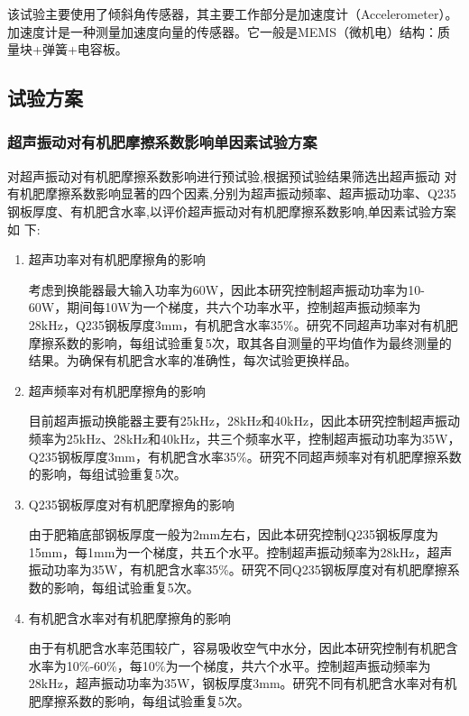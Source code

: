 该试验主要使用了倾斜角传感器，其主要工作部分是加速度计（Accelerometer）。加速度计是一种测量加速度向量的传感器。它一般是MEMS（微机电）结构：质量块+弹簧+电容板。



\subsection{试验方案}

\subsubsection{超声振动对有机肥摩擦系数影响单因素试验方案}

对超声振动对有机肥摩擦系数影响进行预试验,根据预试验结果筛选出超声振动  对有机肥摩擦系数影响显著的四个因素,分别为超声振动频率、超声振动功率、Q235  钢板厚度、有机肥含水率,以评价超声振动对有机肥摩擦系数影响,单因素试验方案如  下:

\begin{enumerate}
	\item 超声功率对有机肥摩擦角的影响

	考虑到换能器最大输入功率为60W，因此本研究控制超声振动功率为10-60W，期间每10W为一个梯度，共六个功率水平，控制超声振动频率为28kHz，Q235钢板厚度3mm，有机肥含水率35\%。研究不同超声功率对有机肥摩擦系数的影响，每组试验重复5次，取其各自测量的平均值作为最终测量的结果。为确保有机肥含水率的准确性，每次试验更换样品。

	\item 超声频率对有机肥摩擦角的影响
	
	目前超声振动换能器主要有25kHz，28kHz和40kHz，因此本研究控制超声振动频率为25kHz、28kHz和40kHz，共三个频率水平，控制超声振动功率为35W，Q235钢板厚度3mm，有机肥含水率35\%。研究不同超声频率对有机肥摩擦系数的影响，每组试验重复5次。

	\item Q235钢板厚度对有机肥摩擦角的影响
	
	由于肥箱底部钢板厚度一般为2mm左右，因此本研究控制Q235钢板厚度为15mm，每1mm为一个梯度，共五个水平。控制超声振动频率为28kHz，超声振动功率为35W，有机肥含水率35\%。研究不同Q235钢板厚度对有机肥摩擦系数的影响，每组试验重复5次。

	\item 有机肥含水率对有机肥摩擦角的影响
	
	由于有机肥含水率范围较广，容易吸收空气中水分，因此本研究控制有机肥含水率为10\%-60\%，每10\%为一个梯度，共六个水平。控制超声振动频率为28kHz，超声振动功率为35W，钢板厚度3mm。研究不同有机肥含水率对有机肥摩擦系数的影响，每组试验重复5次。


\end{enumerate}

